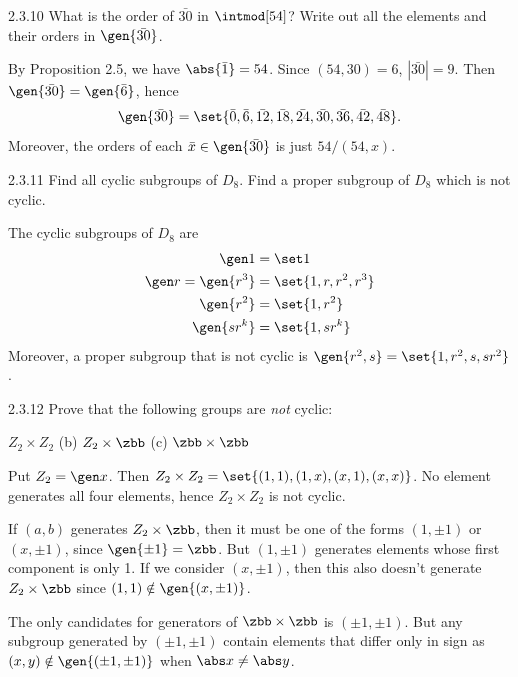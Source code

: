 \begin{exercise}{2.3.10}
    What is the order of $\bar{30}$ in $\intmod[54]$?
	Write out all the elements and their orders in $\gen{\bar{30}}$.
\end{exercise}

\begin{sol}
    By Proposition 2.5, we have $\abs{\bar 1} = 54$.
	Since $(54, 30) = 6$, $|\bar{30}| = 9$.
	Then $\gen{\bar{30}} = \gen{\bar 6}$, hence
    \[
    	\gen{\bar{30}} = \set{\bar 0, \bar 6, \bar{12}, \bar{18}, \bar{24}, \bar{30}, \bar{36}, \bar{42}, \bar{48}}.
    \]
    Moreover, the orders of each $\bar x \in \gen{\bar{30}}$ is just $54/(54, x)$.
\end{sol}

\begin{exercise}{2.3.11}
    Find all cyclic subgroups of $D_8$.
	Find a proper subgroup of $D_8$ which is not cyclic.
\end{exercise}

\begin{sol}
    The cyclic subgroups of $D_8$ are
    \begin{align*}
        \gen 1 & = \set 1 \\
        \gen r = \gen{r^3} & = \set{1, r, r^2, r^3} \\
        \gen{r^2} & = \set{1, r^2} \\
        \gen{sr^k} & = \set{1, sr^k}
    \end{align*}
    Moreover, a proper subgroup that is not cyclic is $\gen{r^2, s} = \set{1, r^2, s, sr^2}$.
\end{sol}

\begin{exercise}{2.3.12}
    Prove that the following groups are \emph{not} cyclic:
    \begin{subexercises}
        \item $Z_2 \times Z_2$ \quad (b) $Z_2 \times \zbb$ \quad (c) $\zbb \times \zbb$
    \end{subexercises}
\end{exercise}

\begin{solenum}
    \item Put $Z_2 = \gen x$.
	Then $Z_2 \times Z_2 = \set{(1, 1), (1, x), (x, 1), (x, x)}$.
    No element generates all four elements, hence $Z_2 \times Z_2$ is not cyclic.
    \item If $(a, b)$ generates $Z_2 \times \zbb$, then it must be one of the forms $(1, \pm 1)$ or $(x, \pm 1)$, since $\gen{\pm 1} = \zbb$.
	But $(1, \pm 1)$ generates elements whose first component is only 1.
	If we consider $(x, \pm 1)$, then this also doesn't generate $Z_2 \times \zbb$ since $(1, 1) \notin \gen{(x, \pm 1)}$.
    \item The only candidates for generators of $\zbb \times \zbb$ is $(\pm 1, \pm 1)$.
	But any subgroup generated by $(\pm 1, \pm 1)$ contain elements that differ only in sign as $(x, y) \notin \gen{(\pm 1, \pm 1)}$ when $\abs x \neq \abs y$.
\end{solenum}

